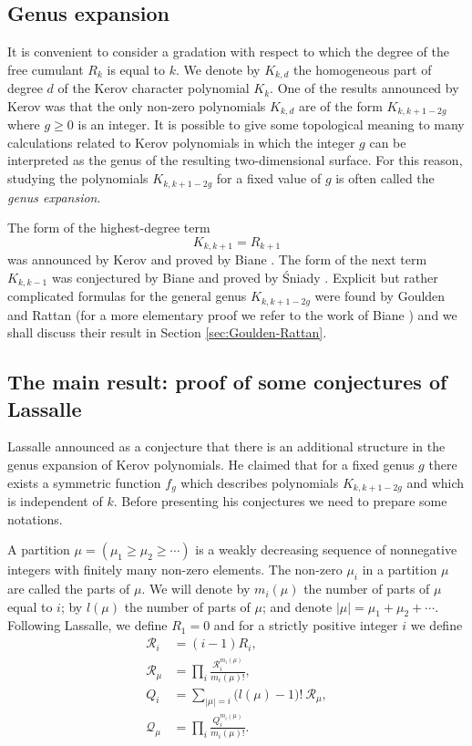 \documentclass[12pt]{amsart}
\theoremstyle{plain}
\theoremstyle{remark}
\begin{document}
\subsection{Genus expansion}
It is convenient to consider a gradation with respect
to which the degree of the free cumulant $R_k$ is equal to $k$. We denote by
$K_{k,d}$ the homogeneous part of degree $d$ of the Kerov character
polynomial $K_k$. One of the results announced by Kerov \cite{Kerov2000talk}
was that the only non-zero polynomials $K_{k,d}$ are of the form
$K_{k,k+1-2g}$ where $g\geq 0$ is an integer. It is possible to give some
topological meaning to many calculations related to Kerov polynomials in which
the integer $g$ can be interpreted as the genus of the resulting two-dimensional
surface. For this reason, studying the polynomials $K_{k,k+1-2g}$ for a fixed
value of $g$ is often called the \emph{genus expansion}.

The form of the highest-degree term
$$ K_{k,k+1} = R_{k+1} $$
was announced by Kerov \cite{Kerov2000talk} and proved by Biane
\cite{Biane2003}. The form of the next term $K_{k,k-1}$ was conjectured by
Biane \cite{Biane2003} and proved by Śniady \cite{'Sniady2006a}.
Explicit but rather complicated formulas for the general genus $K_{k,k+1-2g}$
were found by Goulden and Rattan \cite{GouldenRattan2007} (for a more
elementary proof we refer to the work of Biane \cite{Biane2005/07})
and we shall discuss their result in Section \ref{sec:Goulden-Rattan}.

\subsection{The main result: proof of some conjectures of Lassalle}
Lassalle announced as a conjecture \cite{Lassalle-preprint2007} that there is
an additional structure in the genus expansion of Kerov polynomials. He claimed
that for a fixed genus $g$ there exists a symmetric function $f_g$ which
describes polynomials $K_{k,k+1-2g}$ and which is independent of $k$. Before
presenting his conjectures we need to prepare some notations.
 
A partition $\mu=(\mu_1\geq \mu_2\geq \cdots)$ is a weakly decreasing
sequence of nonnegative integers with finitely many non-zero elements. The
non-zero $\mu_i$ in a partition $\mu$ are
called the parts of $\mu$. We will denote by
$m_i(\mu)$ the number of parts of $\mu$ equal to $i$; by $l(\mu)$ the number
of parts of $\mu$; and denote $|\mu|=\mu_1+\mu_2+\cdots$. Following Lassalle,
we define $R_1 = 0$ and for a strictly positive integer $i$ we define
\begin{align}
\nonumber
\mathcal{R}_i &= (i-1)R_i, \\
\nonumber
\mathcal{R}_\mu &= \prod_{i}
\frac{\mathcal{R}_i^{m_i(\mu)}}{m_i(\mu)!}, \\
\label{eq:qi}
Q_i &= \sum_{|\mu|=i}\big(l(\mu)-1\big)!\ \mathcal{R}_\mu, \\
\nonumber
\mathcal{Q}_\mu &= \prod_{i} \frac{Q_i^{m_i(\mu)}}{m_i(\mu)!}.
\end{align}
\end{document}

